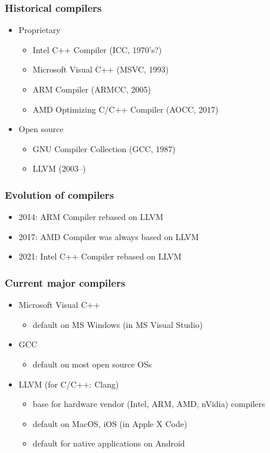 \documentclass[12pt]{article}
\begin{document}
\subsubsection{Historical compilers}

\begin{itemize}
    \item Proprietary
    \begin{itemize}
        \item Intel C++ Compiler (ICC, 1970's?)
        \item Microsoft Visual C++ (MSVC, 1993)
        \item ARM Compiler (ARMCC, 2005)
        \item AMD Optimizing C/C++ Compiler (AOCC, 2017)
    \end{itemize}
    \item Open source
    \begin{itemize}
        \item GNU Compiler Collection (GCC, 1987)
        \item LLVM (2003--)
    \end{itemize}
\end{itemize}
\subsubsection{Evolution of compilers}
\begin{itemize}
    \item 2014: ARM Compiler rebased on LLVM
    \item 2017: AMD Compiler was always based on LLVM
    \item 2021: Intel C++ Compiler rebased on LLVM
\end{itemize}

\subsubsection{Current major compilers}
\begin{itemize}
    \item Microsoft Visual C++
    \begin{itemize}
        \item default on MS Windows (in MS Visual Studio)
    \end{itemize}
    \item GCC
    \begin{itemize}
        \item default on most open source OSs
    \end{itemize}
    \item LLVM (for C/C++: Clang)
    \begin{itemize}
        \item base for hardware vendor (Intel, ARM, AMD, nVidia) compilers
        \item default on MacOS, iOS (in Apple X Code)
        \item default for native applications on Android
    \end{itemize}
\end{itemize}
\end{document}
